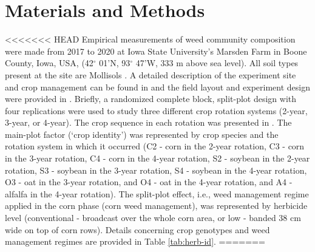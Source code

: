 \documentclass[
]{article}
\begin{document}
\hypertarget{materials-and-methods}{%
\section*{Materials and Methods}\label{materials-and-methods}}

\textless\textless\textless\textless\textless\textless\textless{} HEAD
Empirical measurements of weed community composition were made from 2017 to 2020 at Iowa State University's Marsden Farm in Boone County, Iowa, USA, (42\(^\circ\) 01'N, 93\(^\circ\) 47'W, 333 m above sea level). All soil types present at the site are Mollisols \citep{chenInfluenceResidueNitrogen2014}. A detailed description of the experiment site and crop management can be found in \citet{liebmanWeedSeedbankDiversity2021} and the field layout and experiment design were provided in \citet{nguyenImpactCroppingSysteminreview}. Briefly, a randomized complete block, split-plot design with four replications were used to study three different crop rotation systems (2-year, 3-year, or 4-year). The crop sequence in each rotation was presented in \citet{nguyenImpactCroppingSysteminreview}. The main-plot factor (`crop identity') was represented by crop species and the rotation system in which it occurred (C2 - corn in the 2-year rotation, C3 - corn in the 3-year rotation, C4 - corn in the 4-year rotation, S2 - soybean in the 2-year rotation, S3 - soybean in the 3-year rotation, S4 - soybean in the 4-year rotation, O3 - oat in the 3-year rotation, and O4 - oat in the 4-year rotation, and A4 - alfalfa in the 4-year rotation). The split-plot effect, i.e., weed management regime applied in the corn phase (corn weed management), was represented by herbicide level (conventional - broadcast over the whole corn area, or low - banded 38 cm wide on top of corn rows). Details concerning crop genotypes and weed management regimes are provided in Table \ref{tab:herb-id}.
=======
\end{document}

